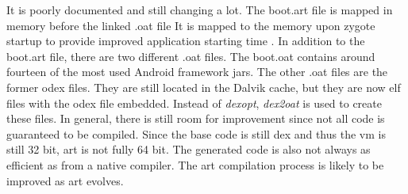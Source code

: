 It is poorly documented and still changing a lot.
The boot.art file is mapped in memory before the linked .oat file
It is mapped to the memory upon zygote startup to provide improved application starting time .
In addition to the boot.art file, there are two different .oat files.
The boot.oat contains around fourteen of the most used Android framework \gls{jar}s.
The other .oat files are the former \gls{odex} files.
They are still located in the Dalvik cache, but they are now \gls{elf} files with the odex file embedded.
Instead of \textit{dexopt}, \textit{dex2oat} is used to create these files. \cite{andevconDalvikART} \cite{developersConfigureArt} \cite{androidArt} \cite{intelArt}
\newline
In general, there is still room for improvement since not all code is guaranteed to be compiled.
Since the base code is still dex and thus the \gls{vm} is still 32 bit, \gls{art} is not fully 64 bit.
The generated code is also not always as efficient as from a native compiler. The \gls{art} compilation process is likely to be improved as \gls{art} evolves.
